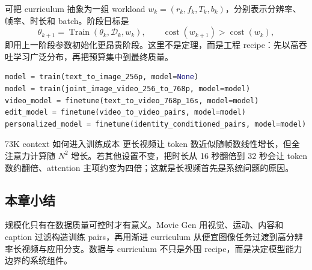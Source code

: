 
可把 curriculum 抽象为一组 workload $w_k=(r_k,f_k,T_k,b_k)$，分别表示分辨率、帧率、时长和 batch。阶段目标是
\[
\theta_{k+1}=\operatorname{Train}(\theta_k,\mathcal D_k,w_k),
\qquad
\operatorname{cost}(w_{k+1})>\operatorname{cost}(w_k),
\]
即用上一阶段参数初始化更昂贵阶段。这里不是定理，而是工程 recipe：先以高吞吐学习广泛分布，再把预算集中到最终质量。

\begin{lstlisting}[language=Python,caption={渐进式图像/视频训练的概念流程}]
model = train(text_to_image_256p, model=None)
model = train(joint_image_video_256_to_768p, model=model)
video_model = finetune(text_to_video_768p_16s, model=model)
edit_model = finetune(video_to_video_pairs, model=model)
personalized_model = finetune(identity_conditioned_pairs, model=model)
\end{lstlisting}

\begin{knowledgebox}{73K context 如何进入训练成本}
更长视频让 token 数近似随帧数线性增长，但全注意力计算随 $N^2$ 增长。若其他设置不变，把时长从 16 秒翻倍到 32 秒会让 token 数约翻倍、attention 主项约变为四倍；这就是长视频首先是系统问题的原因。
\end{knowledgebox}


\subsection{本章小结}

规模化只有在数据质量可控时才有意义。Movie Gen 用视觉、运动、内容和 caption 过滤构造训练 pairs，再用渐进 curriculum 从便宜图像任务过渡到高分辨率长视频与应用分支。数据与 curriculum 不只是外围 recipe，而是决定模型能力边界的系统组件。

